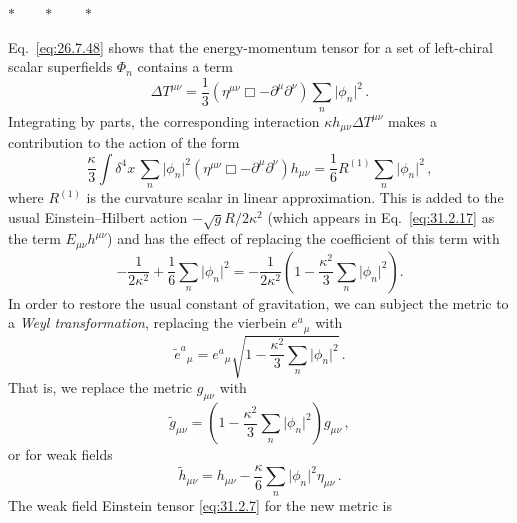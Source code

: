 \begin{center}
\(\ast\qquad\ast\qquad\ast\)
\end{center}

Eq.~\eqref{eq:26.7.48} shows that the energy-momentum tensor for a set of
left-chiral scalar superfields \(\Phi_n\) contains a term
\begin{equation}
  \Delta T^{\mu\nu}
  =\frac13
   \left(\eta^{\mu\nu}\Box-\partial^\mu\partial^\nu\right)
   \sum_n\lvert\phi_n\rvert^2\,.
  \tag{31.2.26}\label{eq:31.2.26}
\end{equation}
Integrating by parts, the corresponding interaction
\(\kappa h_{\mu\nu}\Delta T^{\mu\nu}\) makes a contribution to the action of
the form
\begin{equation}
  \frac{\kappa}{3}\int \delta^4x\,
  \sum_n\lvert\phi_n\rvert^2
  \left(\eta^{\mu\nu}\Box-\partial^\mu\partial^\nu\right)h_{\mu\nu}
  =\frac16R^{(1)}\sum_n\lvert\phi_n\rvert^2\,,
  \tag{31.2.27}\label{eq:31.2.27}
\end{equation}
where \(R^{(1)}\) is the curvature scalar in linear approximation. This is
added to the usual Einstein--Hilbert action
\(-\sqrt{g}R/2\kappa^2\) (which appears in Eq.~\eqref{eq:31.2.17} as the term
\(E_{\mu\nu}h^{\mu\nu}\)) and has the effect of replacing the coefficient of
this term with
\begin{equation}
  -\frac{1}{2\kappa^2}
  +\frac16\sum_n\lvert\phi_n\rvert^2
  =-\frac{1}{2\kappa^2}
   \left(1-\frac{\kappa^2}{3}\sum_n\lvert\phi_n\rvert^2\right).
  \tag{31.2.28}\label{eq:31.2.28}
\end{equation}
In order to restore the usual constant of gravitation, we can subject the
metric to a \emph{Weyl transformation}, replacing the vierbein \(e^a{}_\mu\)
with
\begin{equation}
  \widetilde e^a{}_\mu
  =e^a{}_\mu
   \sqrt{1-\frac{\kappa^2}{3}\sum_n\lvert\phi_n\rvert^2}\,.
  \tag{31.2.29}\label{eq:31.2.29}
\end{equation}
That is, we replace the metric \(g_{\mu\nu}\) with
\begin{equation}
  \widetilde g_{\mu\nu}
  =\left(1-\frac{\kappa^2}{3}\sum_n\lvert\phi_n\rvert^2\right)g_{\mu\nu}\,,
  \tag{31.2.30}\label{eq:31.2.30}
\end{equation}
or for weak fields
\begin{equation}
  \widetilde h_{\mu\nu}
  =h_{\mu\nu}
   -\frac{\kappa}{6}\sum_n\lvert\phi_n\rvert^2\eta_{\mu\nu}\,.
  \tag{31.2.31}\label{eq:31.2.31}
\end{equation}
The weak field Einstein tensor \eqref{eq:31.2.7} for the new metric is
